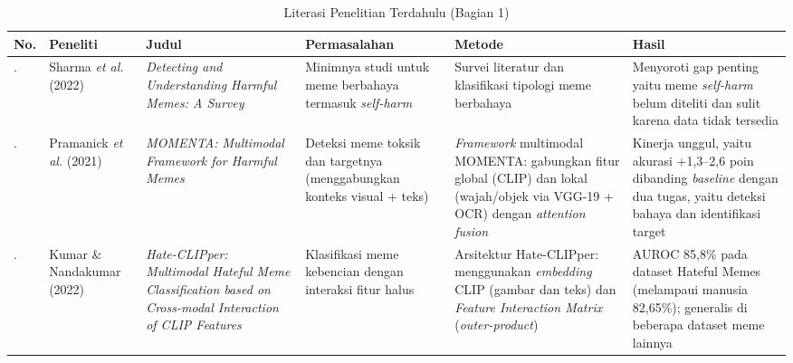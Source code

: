 \begin{landscape}
\begin{table}[H]
    \centering
    \caption{Literasi Penelitian Terdahulu (Bagian 1)}
    \label{table:2.literasi}
    \small
    \setlength{\tabcolsep}{4pt}
    \renewcommand{\arraystretch}{1.2}
    \begin{tabular}{>{\raggedright\arraybackslash}m{0.4cm} >{\raggedright\arraybackslash}m{1.6cm} >{\raggedright\arraybackslash}m{3cm} >{\raggedright\arraybackslash}m{2.8cm} >{\raggedright\arraybackslash}m{3cm} >{\raggedright\arraybackslash}m{3.8cm}}
        \hline
        \textbf{No.} & \textbf{Peneliti} & \textbf{Judul} & \textbf{Permasalahan} & \textbf{Metode} & \textbf{Hasil} \\
        \hline
        1. & Sharma \textit{et al.} (2022) \cite{Sharma2022HarmfulMemes} & \textit{Detecting and Understanding Harmful Memes: A Survey} & Minimnya studi untuk meme berbahaya termasuk \textit{self-harm} & Survei literatur dan klasifikasi tipologi meme berbahaya & Menyoroti gap penting yaitu meme \textit{self-harm} belum diteliti dan sulit karena data tidak tersedia \\
        \hline
        2. & Pramanick \textit{et al.} (2021) \cite{pramanick2021momenta} & \textit{MOMENTA: Multimodal Framework for Harmful Memes} & Deteksi meme toksik dan targetnya (menggabungkan konteks visual + teks) & \textit{Framework} multimodal MOMENTA: gabungkan fitur global (CLIP) dan lokal (wajah/objek via VGG-19 + OCR) dengan \textit{attention fusion} & Kinerja unggul, yaitu akurasi +1,3--2,6 poin dibanding \textit{baseline} dengan dua tugas, yaitu deteksi bahaya dan identifikasi target \\
        \hline
        3. & Kumar \& Nandakumar (2022) \cite{kumar2022hateclipper} & \textit{Hate-CLIPper: Multimodal Hateful Meme Classification based on Cross-modal Interaction of CLIP Features} & Klasifikasi meme kebencian dengan interaksi fitur halus & Arsitektur Hate-CLIPper: menggunakan \textit{embedding} CLIP (gambar dan teks) dan \textit{Feature Interaction Matrix} (\textit{outer-product}) & AUROC 85,8\% pada dataset Hateful Memes (melampaui manusia 82,65\%); generalis di beberapa dataset meme lainnya \\
        \hline
    \end{tabular}
\end{table}

\vspace{0.5cm}


\end{landscape}
